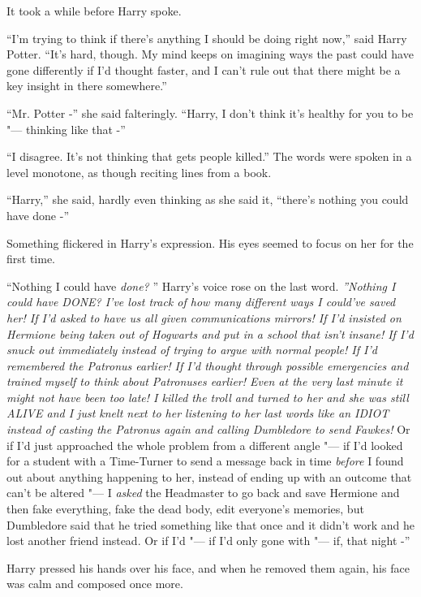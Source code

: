 It took a while before Harry spoke.

``I'm trying to think if there's anything I should be doing right now,''
said Harry Potter. ``It's hard, though. My mind keeps on imagining ways
the past could have gone differently if I'd thought faster, and I can't
rule out that there might be a key insight in there somewhere.''

``Mr. Potter -'' she said falteringly. ``Harry, I don't think it's
healthy for you to be "--- thinking like that -''

``I disagree. It's not thinking that gets people killed.'' The words
were spoken in a level monotone, as though reciting lines from a book.

``Harry,'' she said, hardly even thinking as she said it, ``there's
nothing you could have done -''

Something flickered in Harry's expression. His eyes seemed to focus on
her for the first time.

``Nothing I could have \emph{done?} '' Harry's voice rose on the last
word. \emph{''Nothing I could have DONE? I've lost track of how many
different ways I could've saved her! If I'd asked to have us all given
communications mirrors! If I'd insisted on Hermione being taken out of
Hogwarts and put in a school that isn't insane! If I'd snuck out
immediately instead of trying to argue with normal people! If I'd
remembered the Patronus earlier! If I'd thought through possible
emergencies and trained myself to think about Patronuses earlier! Even
at the very last minute it might not have been too late! I killed the
troll and turned to her and she was still ALIVE and I just knelt next to
her listening to her last words like an IDIOT instead of casting the
Patronus again and calling Dumbledore to send Fawkes!} Or if I'd just
approached the whole problem from a different angle "--- if I'd looked for
a student with a Time-Turner to send a message back in time
\emph{before} I found out about anything happening to her, instead of
ending up with an outcome that can't be altered "--- I \emph{asked} the
Headmaster to go back and save Hermione and then fake everything, fake
the dead body, edit everyone's memories, but Dumbledore said that he
tried something like that once and it didn't work and he lost another
friend instead. Or if I'd "--- if I'd only gone with "--- if, that night -''

Harry pressed his hands over his face, and when he removed them again,
his face was calm and composed once more.

